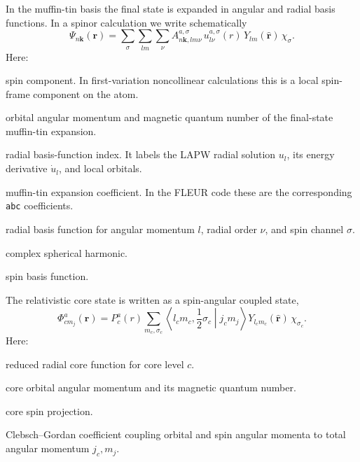 \documentclass[11pt,a4paper]{article}
\newcommand{\kvec}{\mathbf{k}}
\newcommand{\rvec}{\mathbf{r}}
\newcommand{\absr}{a}
\newcommand{\sig}{\sigma}
\begin{document}
In the muffin-tin basis the final state is expanded in angular and radial basis
functions. In a spinor calculation we write schematically
\begin{equation}
\label{eq:mt-expansion}
  \Psi_{n\kvec}(\rvec)
  =
  \sum_{\sig}
  \sum_{l m}
  \sum_{\nu}
  A^{\absr,\sig}_{n\kvec,lm\nu}\,
  u^{\absr,\sig}_{l\nu}(r)\,
  Y_{lm}(\hat{\rvec})\,
  \chi_{\sig}.
\end{equation}
Here:
\begin{description}[leftmargin=2.7cm,style=nextline]
  \item[\(\sig\)] spin component. In first-variation noncollinear calculations
  this is a local spin-frame component on the atom.
  \item[\(l,m\)] orbital angular momentum and magnetic quantum number of the
  final-state muffin-tin expansion.
  \item[\(\nu\)] radial basis-function index. It labels the LAPW radial
  solution \(u_l\), its energy derivative \(\dot{u}_l\), and local orbitals.
  \item[\(A^{\absr,\sig}_{n\kvec,lm\nu}\)] muffin-tin expansion coefficient.
  In the FLEUR code these are the corresponding \texttt{abc} coefficients.
  \item[\(u^{\absr,\sig}_{l\nu}(r)\)] radial basis function for angular momentum
  \(l\), radial order \(\nu\), and spin channel \(\sig\).
  \item[\(Y_{lm}\)] complex spherical harmonic.
  \item[\(\chi_{\sig}\)] spin basis function.
\end{description}

The relativistic core state is written as a spin-angular coupled state,
\begin{equation}
\label{eq:core-state}
  \Phi^{\absr}_{c m_j}(\rvec)
  =
  P^{\absr}_{c}(r)
  \sum_{m_c,\sig_c}
  \left\langle
    l_c m_c,\frac12 \sig_c
  \middle|
    j_c m_j
  \right\rangle
  Y_{l_c m_c}(\hat{\rvec})\,\chi_{\sig_c}.
\end{equation}
Here:
\begin{description}[leftmargin=2.7cm,style=nextline]
  \item[\(P^{\absr}_{c}(r)\)] reduced radial core function for core level \(c\).
  \item[\(l_c,m_c\)] core orbital angular momentum and its magnetic quantum
  number.
  \item[\(\sig_c=\pm 1/2\)] core spin projection.
  \item[\(\langle l_c m_c,\frac12\sig_c|j_c m_j\rangle\)] Clebsch--Gordan
  coefficient coupling orbital and spin angular momenta to total angular
  momentum \(j_c,m_j\).
\end{description}
\end{document}
